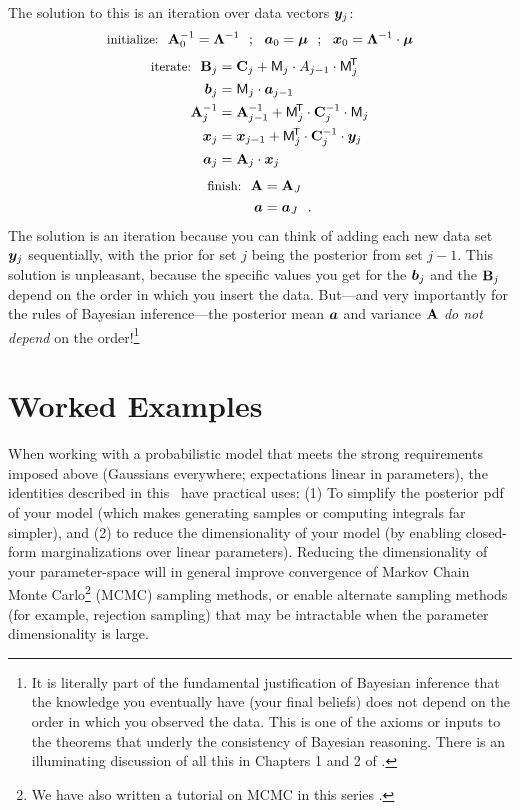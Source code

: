 The solution to this is an iteration over data vectors $\boldsymbol{y}_j$:
\begin{equation}
  \mbox{\small initialize:}~~
  \mathbf{A}_0^{-1} = \mathbf{\Lambda}^{-1} ~~;~~ \boldsymbol{a}_0 = \boldsymbol{\mu} ~~;~~ \boldsymbol{x}_0 = \mathbf{\Lambda}^{-1}\cdot\boldsymbol{\mu}
\end{equation}
\begin{align}
  \mbox{\small iterate:}~~
  \mathbf{B}_j &= \mathbf{C}_j + \mathsf{M}_j \cdot A_{j-1} \cdot \mathsf{M}_j^{\!\mathsf{T}\!} \\
  \boldsymbol{b}_j &= \mathsf{M}_j \cdot \boldsymbol{a}_{j-1} \\
  \mathbf{A}_j^{-1} &= \mathbf{A}_{j-1}^{-1} + \mathsf{M}_j^{\!\mathsf{T}\!} \cdot \mathbf{C}_j^{-1} \cdot \mathsf{M}_j \\
  \boldsymbol{x}_j &= \boldsymbol{x}_{j-1} + \mathsf{M}_j^{\!\mathsf{T}\!} \cdot \mathbf{C}_j^{-1} \cdot \boldsymbol{y}_j \\
  \boldsymbol{a}_j &= \mathbf{A}_j \cdot \boldsymbol{x}_j
\end{align}
\begin{align}
  \mbox{\small finish:}~~
  \mathbf{A} &= \mathbf{A}_J \\
  \boldsymbol{a} &= \boldsymbol{a}_J
  ~~.
\end{align}
The solution is an iteration because you can think of adding each new data
set $\boldsymbol{y}_j$ sequentially, with the prior for set $j$ being the posterior from
set $j-1$.
This solution is unpleasant, because the specific values you get for the
$\boldsymbol{b}_j$ and the $\mathbf{B}_j$ depend on the order in which you insert the data.
But---and very importantly for the rules of Bayesian inference---the posterior
mean $\boldsymbol{a}$ and variance $\mathbf{A}$ \emph{do not depend} on the order!\footnote{
  It is literally part of the fundamental justification of Bayesian inference
  that the knowledge you eventually have (your final beliefs) does not depend
  on the order in which you observed the data. This is one of the axioms or inputs
  to the theorems that underly the consistency of Bayesian reasoning.
  There is an illuminating discussion of all this in Chapters 1 and 2 of \cite{jaynes}.}


\section{Worked Examples}\label{sec:examples}

When working with a probabilistic model that meets the strong requirements
imposed above (Gaussians everywhere; expectations linear in parameters),
the identities described in this
\documentname\ have practical uses: (1) To simplify the posterior pdf of your
model (which makes generating samples or computing integrals far simpler), and
(2) to reduce the dimensionality of your model (by enabling closed-form
marginalizations over linear parameters).
Reducing the dimensionality of your parameter-space will in general improve
convergence of Markov Chain Monte Carlo\footnote{We have also written a tutorial
  on MCMC in this series \citep{Hogg:2018}.} (MCMC)
sampling methods, or enable
alternate sampling methods (for example, rejection sampling) that may be intractable
when the parameter dimensionality is large.

